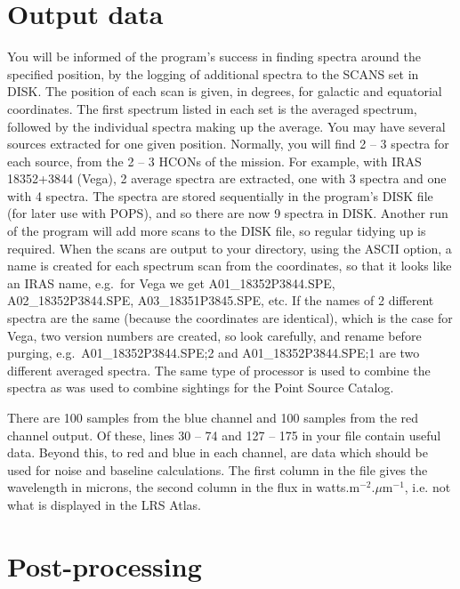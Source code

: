 \section{Output data}
You will be informed of the program's success in finding spectra around the
specified position, by the logging of additional spectra to the SCANS set 
in DISK.
The position of each scan is given, in degrees, for galactic and equatorial
coordinates.
The first spectrum listed in each set is the averaged spectrum, followed by
the individual spectra making up the average.
You may have several sources extracted for one given position.
Normally, you will find 2 -- 3 spectra for each source, from the 2 -- 3
HCONs of the mission.
For example, with IRAS 18352+3844 (Vega), 2 average spectra are extracted,
one with 3 spectra and one with 4 spectra. 
The spectra are stored sequentially in the program's DISK file (for later
use with POPS), and so there are now 9 spectra in DISK.
Another run of the program will add more scans to the DISK file, so regular
tidying up is required.
When the scans are output to your directory, using the ASCII option, a name
is created for each spectrum scan from the coordinates, so that it looks like
an IRAS name, e.g.\ for Vega we get A01\_18352P3844.SPE, A02\_18352P3844.SPE,
A03\_18351P3845.SPE, etc.
If the names of 2 different spectra are the same (because the coordinates are
identical), which is the case for Vega, two version numbers are created, so 
look carefully, and rename before purging, e.g.\ A01\_18352P3844.SPE;2 and 
A01\_18352P3844.SPE;1 are two different averaged spectra.  
The same type of processor is used to combine the spectra as was used to
combine sightings for the Point Source Catalog.

There are 100 samples from the blue channel and 100 samples from the red 
channel output. 
Of these, lines 30 -- 74 and 127 -- 175 in your file contain useful data.
Beyond this, to red and blue in each channel, are data which should be used for
noise and baseline calculations. 
The first column in the file gives the wavelength in microns, the second
column in the flux in watts.m$^{-2}$.$\mu$m$^{-1}$, i.e. not what is 
displayed in the LRS Atlas.

\section{Post-processing}

